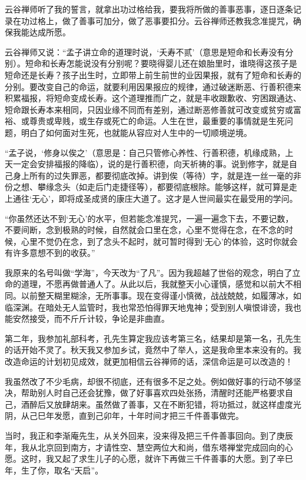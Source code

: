 \documentclass[12pt,UTF8]{ctexbook}
\begin{document}
云谷禅师听了我的誓言，就拿出功过格给我，要我将所做的善事恶事，逐日逐条记录在功过格上，做了善事可加分，做了恶事要扣分。云谷禅师还教我念准提咒，确保我能达成所愿。

云谷禅师又说：“孟子讲立命的道理时说，‘夭寿不贰’（意思是短命和长寿没有分别）。短命和长寿怎能说没有分别呢？要晓得婴儿还在娘胎里时，谁晓得这孩子是短命还是长寿？孩子出生时，立即带上前生前世的业因果报，就有了短命和长寿的分别。要改变自己的命运，就要利用因果报应的规律，通过破迷断恶、行善积德来积累福报，将短命变成长寿。这个道理推而广之，就是丰收跟歉收、穷困跟通达、短命跟长寿本来相同，只因业缘不同而有差别，通过断恶修善就可改变或贫穷或富裕、或尊贵或卑贱，或生存或死亡的命运。人生在世，最重要的事情就是生死问题，明白了如何面对生死，也就能从容应对人生中的一切顺境逆境。

“孟子说，‘修身以俟之’（意思是：自己只管修心养性、行善积德，机缘成熟，上天一定会安排福报的降临），说的是行善积德，向天祈祷的事。说到修字，就是自己身上所有的过失罪恶，都要彻底改掉。讲到俟（等待）字，就是连一丝一毫的非份之想、攀缘念头（如走后门走捷径等），都要彻底根除。能够这样，就可算是走上通往‘无心’，即将成圣成贤的康庄大道了。这才是人世间最实在最受用的学问。

“你虽然还达不到‘无心’的水平，但若能念准提咒，一遍一遍念下去，不要记数，不要间断，念到极熟的时候，自然就会口里在念，心里不觉得在念，在不念的时候，心里不觉仍在念，到了念头不起时，就可暂时得到‘无心’的体验，这时你就会有许多意想不到的收获。”

我原来的名号叫做“学海”，今天改为“了凡”。因为我超越了世俗的观念，明白了立命的道理，不愿再做普通人了。从此以后，我就整天小心谨慎，感觉和以前大不相同。以前整天糊里糊涂，无所事事。现在变得谨小慎微，战战兢兢，如履薄冰，如临深渊。在暗处无人监管时，我也常恐怕得罪天地鬼神；受到别人嗔恨诽谤，我也能安然接受，而不斤斤计较，争论是非曲直。

第二年，我参加礼部科考，孔先生算定我应该考第三名，结果却是第一名，孔先生的话开始不灵了。秋天我又参加乡试，竟然中了举人，这是我命里本来没有的。我改造命运的计划初见成效，就更加相信云谷禅师的话，深信命运是可以改造的！

我虽然改了不少毛病，却很不彻底，还有很多不足之处。例如做好事的行动不够坚决，帮助别人时自己还会犹豫，做了好事喜欢四处张扬，清醒时还能严格要求自己，酒醉后又放肆胡来。虽然做了善事，又在不断犯错，将功抵过，就这样虚度光阴，从己巳年发愿，直到己卯年，十年时间才把三千件善事做完。

当时，我正和李渐庵先生，从关外回来，没来得及把三千件善事回向。到了庚辰年，我从北京回到南方，才请性空、慧空两位大和尚，借东塔禅堂完成回向的心愿。这时，我又起了求生儿子的心愿，就许下再做三千件善事的大愿。到了辛巳年，生了你，取名“天启”。
\end{document}
